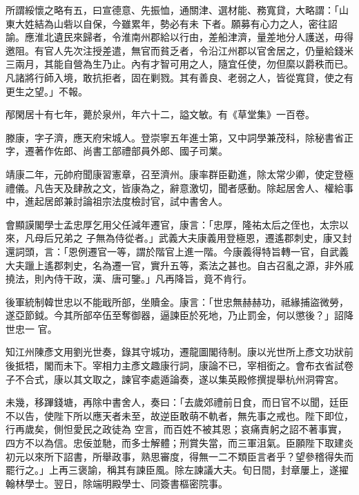 \begin{pinyinscope}
 所謂綏懷之略有五，曰宣德意、先振恤，通關津、選材能、務寬貸，大略謂：「山東大姓結為山砦以自保，今雖累年，勢必有未
 下者。願募有心力之人，密往詔諭。應淮北遺民來歸者，令淮南州郡給以行由，差船津濟，量差地分人護送，毋得邀阻。有官人先次注授差遣，無官而貧乏者，令沿江州郡以官舍居之，仍量給錢米三兩月，其能自營為生乃止。內有才智可用之人，隨宜任使，勿但縻以爵秩而已。凡諸將行師入境，敢抗拒者，固在剿戮。其有善良、老弱之人，皆從寬貸，使之有更生之望。」不報。



 邴閑居十有七年，薨於泉州，年六十二，謚文敏。有《草堂集》一百卷。



 滕康，字子濟，應天府宋城人。登崇寧五年進士第，又中詞學兼茂科，除秘書省正字，遷著作佐郎、尚書工部禮部員外郎、國子司業。



 靖康二年，元帥府聞康習憲章，召至濟州。康率群臣勸進，除太常少卿，使定登極禮儀。凡告天及肆赦之文，皆康為之，辭意激切，聞者感動。除起居舍人、權給事中，進起居郎兼討論祖宗法度檢討官，試中書舍人。



 會顯謨閣學士孟忠厚乞用父任減年遷官，康言：「忠厚，隆祐太后之侄也，太宗以來，凡母后兄弟之
 子無為侍從者。」武義大夫康義用登極恩，遷遙郡刺史，康又封還詞頭，言：「恩例遷官一等，謂於階官上進一階。今康義得特旨轉一官，自武義大夫躐上遙郡刺史，名為遷一官，實升五等，紊法之甚也。自古召亂之源，非外戚撓法，則內侍干政，漢、唐可鑒。」凡再降旨，竟不肯行。



 後軍統制韓世忠以不能戢所部，坐贖金。康言：「世忠無赫赫功，祗緣捕盜微勞，遂亞節鉞。今其所部卒伍至奪御器，逼諫臣於死地，乃止罰金，何以懲後？」詔降世忠一
 官。



 知江州陳彥文用劉光世奏，錄其守城功，遷龍圖閣待制。康以光世所上彥文功狀前後抵牾，閣而未下。宰相力主彥文趣康行詞，康論不已，宰相銜之。會布衣省試卷子不合式，康以其文取之，諫官李處遁論奏，遂以集英殿修撰提舉杭州洞霄宮。



 未幾，移蹕錢塘，再除中書舍人，奏曰：「去歲郊禮前日食，而日官不以聞，廷臣不以告，使陛下所以應天者未至，故逆臣敢萌不軌者，無先事之戒也。陛下即位，行再歲矣，側怛愛民之政徒為
 空言，而百姓不被其恩；哀痛責躬之詔不著事實，四方不以為信。忠佞並馳，而多士解體；刑賞失當，而三軍沮氣。臣願陛下取建炎初元以來所下詔書，所舉政事，熟思審度，得無一二不類臣言者乎？望參稽得失而罷行之。」上再三褒諭，稱其有諫臣風。除左諫議大夫。旬日間，封章屢上，遂擢翰林學士。翌日，除端明殿學士、同簽書樞密院事。




\end{pinyinscope}
